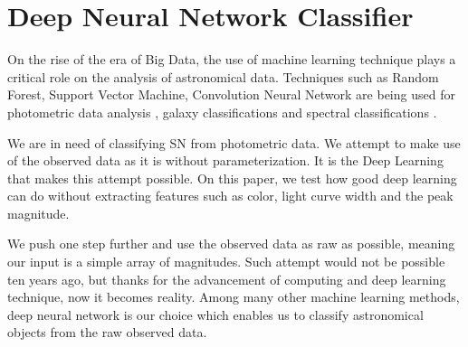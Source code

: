 \documentclass[useamsfonts]{pasj01}
\begin{document}
\section{Deep Neural Network Classifier}
\label{sec:DNN}
On the rise of the era of Big Data, the use of machine learning technique plays a critical role on the analysis of astronomical data.  Techniques such as Random Forest, Support Vector Machine, Convolution Neural Network are being used for photometric data analysis \citep{pasquet19a}, galaxy classifications \citep{hausen19a} and spectral 
classifications \citep{garciadias18a,muthukrishna19c,sharma20a}.

We are in need of classifying SN from photometric data.
We attempt to make use of the observed data as it is without parameterization.
It is the Deep Learning that makes this attempt possible.
On this paper, we test how good deep learning can do without extracting features such as color, light curve width and the peak magnitude.

We push one step further and use the observed data as raw as possible, meaning our input is a simple array of magnitudes.  Such attempt would not be possible ten years ago, but thanks for the advancement of computing and deep learning technique, now it becomes reality.  Among many other machine learning methods, deep neural network is our choice which enables us to classify astronomical objects from the raw observed data. 
\end{document}
